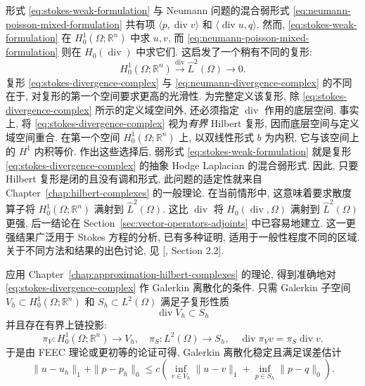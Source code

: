 形式 \eqref{eq:stokes-weak-formulation} 与 Neumann 问题的混合弱形式 \eqref{eq:neumann-poisson-mixed-formulation} 共有项 $\langle p,\operatorname{div}v\rangle$ 和 $\langle\operatorname{div}u,q\rangle$. 然而, \eqref{eq:stokes-weak-formulation} 在 $ H_{0}^1(\Omega;\mathbb R^n)$ 中求 $u,v$, 而 \eqref{eq:neumann-poisson-mixed-formulation} 则在 $ H_{0}(\operatorname{div})$ 中求它们. 这启发了一个稍有不同的复形:
\begin{equation}\label{eq:stokes-divergence-complex}
 H_{0}^1(\Omega;\mathbb R^n)\xrightarrow{\operatorname{div}}\hat L^2(\Omega)\to0.
\end{equation}
复形 \eqref{eq:stokes-divergence-complex} 与 \eqref{eq:neumann-divergence-complex} 的不同在于, 对复形的第一个空间要求更高的光滑性. 为完整定义该复形, 除 \eqref{eq:stokes-divergence-complex} 所示的定义域空间外, 还必须指定 $\operatorname{div}$ 作用的底层空间. 事实上, 将 \eqref{eq:stokes-divergence-complex} 视为\emph{有界} Hilbert 复形, 因而底层空间与定义域空间重合. 在第一个空间 $ H_{0}^1(\Omega;\mathbb R^n)$ 上, 以双线性形式 $b$ 为内积, 它与该空间上的 $H^1$ 内积等价. 作出这些选择后, 弱形式 \eqref{eq:stokes-weak-formulation} 就是复形 \eqref{eq:stokes-divergence-complex} 的抽象 Hodge Laplacian 的混合弱形式. 因此, 只要 Hilbert 复形是闭的且没有调和形式, 此问题的适定性就来自 Chapter~\ref{chap:hilbert-complexes} 的一般理论. 在当前情形中, 这意味着要求散度算子将 $ H_{0}^1(\Omega;\mathbb R^n)$ 满射到 $\hat L^2(\Omega)$. 这比 $\operatorname{div}$ 将 $ H_{0}(\operatorname{div},\Omega)$ 满射到 $\hat L^2(\Omega)$ 更强, 后一结论在 Section~\ref{sec:vector-operators-adjoints} 中已容易地建立. 这一更强结果广泛用于 Stokes 方程的分析, 已有多种证明, 适用于一般性程度不同的区域. 关于不同方法和结果的出色讨论, 见 [, Section 2.2].

应用 Chapter~\ref{chap:approximation-hilbert-complexes} 的理论, 得到准确地对 \eqref{eq:stokes-divergence-complex} 作 Galerkin 离散化的条件. 只需 Galerkin 子空间 $V_h\subset H_{0}^1(\Omega;\mathbb R^n)$ 和 $S_h\subset L^2(\Omega)$ 满足子复形性质
\begin{equation}\label{eq:stokes-discrete-subcomplex}
\operatorname{div}V_h\subset S_h
\end{equation}
并且存在有界上链投影:
\[
\pi_V: H_{0}^1(\Omega;\mathbb R^n)\to V_h,\quad\pi_S:L^2(\Omega)\to S_h,\quad\operatorname{div}\pi_Vv=\pi_S\operatorname{div}v.
\]
于是由 FEEC 理论或更初等的论证可得, Galerkin 离散化稳定且满足误差估计
\begin{equation}\label{eq:stokes-galerkin-error}
\|u-u_h\|_1+\|p-p_h\|_0\leq c\left(\inf_{v\in V_h}\|u-v\|_1+\inf_{p\in S_h}\|p-q\|_0\right).
\end{equation}

